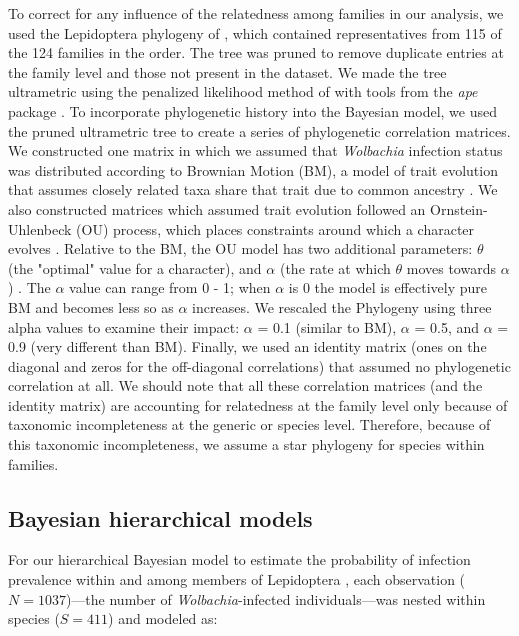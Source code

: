 \documentclass{frontiersSCNS}
\begin{document}
To correct for any influence of the relatedness among families in our analysis, we used the Lepidoptera phylogeny of \citet{Regier:2013fp}, which contained representatives from 115 of the 124 families in the order. The tree was pruned to remove duplicate entries at the family level and those not present in the  \cite{Weinert:2015aa} dataset. We made the tree ultrametric using the penalized likelihood method of \citet{Sanderson:2002vy} with tools from the \textit{ape} package \citep{Paradis:2004dv}. To incorporate phylogenetic history into the Bayesian model, we used the pruned ultrametric tree to create a series of phylogenetic correlation matrices. We constructed one matrix in which we assumed that \textit{Wolbachia} infection status was distributed according to Brownian Motion (BM), a model of trait evolution that assumes closely related taxa share that trait due to common ancestry \citep{Paradis:2012wn}. We also constructed matrices which assumed trait evolution followed an Ornstein-Uhlenbeck (OU) process, which places constraints around which a character evolves \citep{Paradis:2012wn}. Relative to the BM, the OU model has two additional parameters: $\theta$ (the "optimal" value for a character), and $\alpha$ (the rate at which $\theta$ moves towards $\alpha$) \citep{Paradis:2012wn}. The $\alpha$ value can range from 0 - 1; when $\alpha$ is 0 the model is effectively pure BM and becomes less so as $\alpha$ increases. We rescaled the Phylogeny using three alpha values to examine their impact: $\alpha$ = 0.1 (similar to BM), $\alpha$ = 0.5, and $\alpha$ = 0.9 (very different than BM). Finally, we used an identity matrix (ones on the diagonal and zeros for the off-diagonal correlations) that assumed no phylogenetic correlation at all. We should note that all these correlation matrices (and the identity matrix) are accounting for relatedness at the family level only because of taxonomic incompleteness at the generic or species level. Therefore, because of this taxonomic incompleteness, we assume a star phylogeny for species within families.

\subsection{Bayesian hierarchical models}
	For our hierarchical Bayesian model to estimate the probability of infection prevalence within and among members of Lepidoptera , each observation ($N=1037$)---the number of \emph{Wolbachia}-infected individuals---was nested within species ($S=411$) and modeled as:
\end{document}
